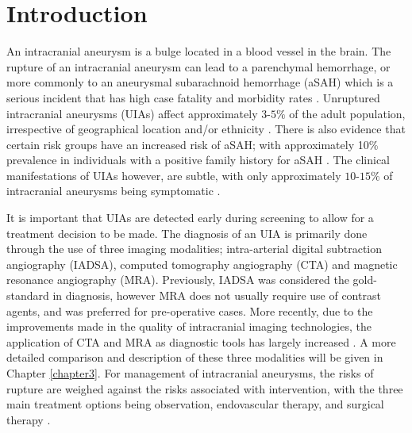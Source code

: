 \chapter{Introduction}
\label{chapter1}

An intracranial aneurysm is a bulge located in a blood vessel in the brain. The rupture of an intracranial aneurysm can lead to a parenchymal hemorrhage, or more commonly to an aneurysmal subarachnoid hemorrhage (aSAH) which is a serious incident that has high case fatality and morbidity rates \cite{Keedy2006}. Unruptured intracranial aneurysms (UIAs) affect approximately $3$-$5 \%$ of the adult population, irrespective of geographical location and/or ethnicity \cite{vlak2011prevalence}. There is also evidence that certain risk groups have an increased risk of aSAH; with approximately 10\% prevalence in individuals with a positive family history for aSAH \cite{bor2014long}. The clinical manifestations of UIAs however, are subtle, with only approximately $10$-$15\%$ of intracranial aneurysms being symptomatic \cite{friedman2001small}. 

It is important that UIAs are detected early during screening to allow for a treatment decision to be made. The diagnosis of an UIA is primarily done through the use of three imaging modalities; intra-arterial digital subtraction angiography (IADSA), computed tomography angiography (CTA) and magnetic resonance angiography (MRA). Previously, IADSA was considered the gold-standard in diagnosis, however MRA does not usually require use of contrast agents, and was preferred for pre-operative cases. More recently, due to the improvements made in the quality of intracranial imaging technologies, the application of CTA and MRA as diagnostic tools has largely increased \cite{Brown2014}. A more detailed comparison and description of these three modalities will be given in Chapter \ref{chapter3}. For management of intracranial aneurysms, the risks of rupture are weighed against the risks associated with intervention, with the three main treatment options being observation, endovascular therapy, and surgical therapy \cite{Keedy2006}. 


